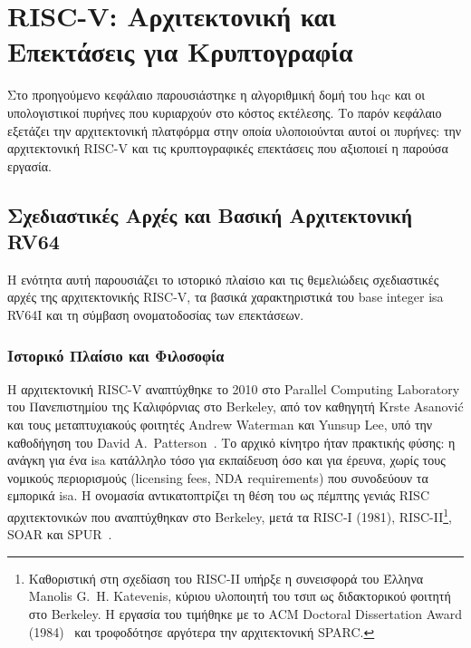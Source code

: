 \chapter{RISC-V: Αρχιτεκτονική και Επεκτάσεις για Κρυπτογραφία}
\label{ch:risc-v-architecture}

Στο προηγούμενο κεφάλαιο παρουσιάστηκε η αλγοριθμική δομή του \gls{hqc} και οι
υπολογιστικοί πυρήνες που κυριαρχούν στο κόστος εκτέλεσης. Το παρόν κεφάλαιο
εξετάζει την αρχιτεκτονική πλατφόρμα στην οποία υλοποιούνται αυτοί οι πυρήνες:
την αρχιτεκτονική RISC-V και τις κρυπτογραφικές επεκτάσεις που αξιοποιεί η
παρούσα εργασία.

\section{Σχεδιαστικές Αρχές και Βασική Αρχιτεκτονική RV64}
\label{sec:rv64-design}

Η ενότητα αυτή παρουσιάζει το ιστορικό πλαίσιο και τις θεμελιώδεις
σχεδιαστικές αρχές της αρχιτεκτονικής RISC-V, τα βασικά χαρακτηριστικά του
base integer \gls{isa} RV64I και τη σύμβαση ονοματοδοσίας των επεκτάσεων.

\subsection{Ιστορικό Πλαίσιο και Φιλοσοφία}
\label{ssec:riscv-history}

Η αρχιτεκτονική RISC-V αναπτύχθηκε το 2010 στο Parallel Computing Laboratory
του Πανεπιστημίου της Καλιφόρνιας στο Berkeley, από τον καθηγητή
Krste Asanović και τους μεταπτυχιακούς φοιτητές Andrew Waterman και Yunsup
Lee, υπό την καθοδήγηση του David A.~Patterson~\cite{Waterman2011-riscv}. Το αρχικό κίνητρο ήταν πρακτικής φύσης: η
ανάγκη για ένα \gls{isa} κατάλληλο τόσο για εκπαίδευση όσο και για έρευνα,
χωρίς τους νομικούς περιορισμούς (licensing fees, NDA requirements) που
συνοδεύουν τα εμπορικά \gls{isa}. Η ονομασία  αντικατοπτρίζει τη θέση
του ως πέμπτης γενιάς RISC αρχιτεκτονικών που αναπτύχθηκαν στο Berkeley,
μετά τα RISC-I (1981), RISC-II\footnote{Καθοριστική στη σχεδίαση του RISC-II υπήρξε η συνεισφορά του Έλληνα Manolis G.~H. Katevenis, κύριου υλοποιητή του τσιπ ως διδακτορικού φοιτητή στο Berkeley. Η εργασία του τιμήθηκε με το ACM Doctoral Dissertation Award (1984)~\cite{Katevenis1983-risc2} και τροφοδότησε αργότερα την αρχιτεκτονική SPARC.}, SOAR και SPUR~\cite{Waterman2011-riscv}.

